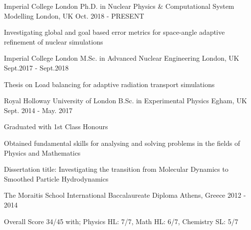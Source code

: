 \begin{cventries}
	\cventry
	{Imperial College London}
	{Ph.D. in Nuclear Physics \& Computational System Modelling}
	{London, UK}
	{Oct. 2018 - PRESENT}
	{
		\begin{cvitems}
			\item {Investigating global and goal based error metrics for
			            space-angle adaptive refinement of nuclear simulations}
		\end{cvitems}
	}
	\cventry
	{Imperial College London}
	{M.Sc. in Advanced Nuclear Engineering}
	{London, UK}
	{Sept.2017 - Sept.2018}
	{
		\begin{cvitems}
			\item {Thesis on Load balancing for adaptive radiation transport simulations}
		\end{cvitems}
	}

	\cventry
	{Royal Holloway University of London}
	{B.Sc. in Experimental Physics}
	{Egham, UK}
	{Sept. 2014 - May. 2017}
	{
		\begin{cvitems}
			\item {Graduated with 1st Class Honours}
			\item {Obtained fundamental skills for analysing and solving
			            problems in the fields of Physics and Mathematics}
			\item {Dissertation title: Investigating the transition from
			            Molecular Dynamics to Smoothed Particle Hydrodynamics}
		\end{cvitems}
	}

	\cventry
	{The Moraitis School}
	{International Baccalaureate Diploma}
	{Athens, Greece}
	{2012 - 2014}
	{
		\begin{cvitems}
			\item {Overall Score 34/45 with; Physics HL: 7/7, Math HL: 6/7, Chemistry SL: 5/7}
		\end{cvitems}
	}

\end{cventries}
